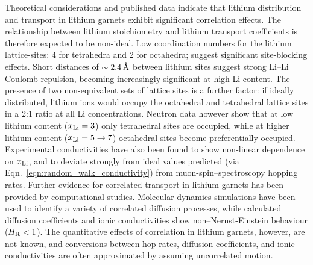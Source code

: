 \documentclass[aps,prb,twocolumn,superscriptaddress,reprint]{revtex4-1}
\newcommand{\xLi}{x_\m{Li}}
\newcommand{\angstrom}{\mbox{\normalfont\AA}}
\begin{document}
Theoretical considerations and published data indicate that lithium distribution and transport in lithium garnets exhibit significant correlation effects. 
The relationship between lithium stoichiometry and lithium transport coefficients is therefore expected to be non-ideal. 
Low coordination numbers for the lithium lattice-sites: 4 for tetrahedra and 2 for octahedra; suggest significant site-blocking effects.\cite{AwakaEtAl_ChemLett2011} Short distances of $\sim2.4\u{\angstrom}$ between lithium sites suggest strong Li--Li Coulomb repulsion, becoming increasingly significant at high Li content.\cite{OCallaghanAndCussen_ChemComm2007,OCallaghanAndCussen_SolStatSci2008,Cussen_JMaterChem2010,WangEtAl_SolStatIonics2014} The presence of two non-equivalent sets of lattice sites is a further factor: if ideally distributed, lithium ions would occupy the octahedral and tetrahedral lattice sites in a 2:1 ratio at all Li concentrations. 
Neutron data however show that at low lithium content ($\xLi=3$) only tetrahedral sites are occupied,\cite{OCallaghanEtAl_ChemMater2006} while at higher lithium content ($\xLi=5\to7$) octahedral sites become preferentially occupied.\cite{Cussen_JMaterChem2010,ThangaduraiEtAl_JPhysChemLett2015} Experimental conductivities have also been found to show non-linear dependence on $\xLi$,\cite{ThompsonEtAl_AdvEnergyMater2015} and to deviate strongly from ideal values predicted (via Eqn.~\ref{eqn:random_walk_conductivity}) from muon-spin--spectroscopy hopping rates.\cite{NozakiEtAl_SolStatIonics2014} Further evidence for correlated transport in lithium garnets has been provided by computational studies. 
Molecular dynamics simulations have been used to identify a variety of correlated diffusion processes,\cite{JalemEtAl_ChemMater2013, MeierEtAl_JPhysChemC2014,KlenkAndLai_PhysChemChemPhys2015, BurbanoEtAl_PhysRevLett2016} while calculated diffusion coefficients and ionic conductivities show non--Nernst-Einstein behaviour ($H_{\mathrm{R}}<1$).\cite{KlenkAndLai_SolStatIonics2016, Burbano_Garnets_InPreparation} The quantitative effects of correlation in lithium garnets, however, are not known, and conversions between hop rates, diffusion coefficients, and ionic conductivities are often approximated by assuming uncorrelated motion.\cite{KuhnEtAl_PhysRevB2011,KuhnEtAl_JPhys-CondensMat2011,MiaraEtAl_ChemMater2013,Rustad_arXiv2016,GuEtAl_SolStatIonics2015,NozakiEtAl_SolStatIonics2014,ZeierEtAl_ACSApplMaterInt2014,JalemEtAl_ChemMater2013,AdamsAndRao_JMaterChem2012,DuvelEtAl_JPhysChemC2012,NarayananEtAl_RSCAdv2012,RamzyAndThangadurai_ACSApplMaterInt2010,AmoresEtAl_JMaterChemA2016}
\end{document}
